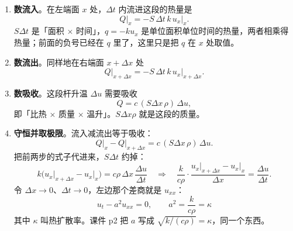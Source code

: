 \begin{enumerate}[label=\textbf{第 \arabic* 步}]
  \item \textbf{数流入}。在左端面 $x$ 处，$\Delta t$ 内流进这段的热量是
  \begin{equation}
    Q\big|_x=-S\,\Delta t\,k\,u_x\big|_x .
  \end{equation}
  $S\Delta t$ 是「面积 $\times$ 时间」，$q=-ku_x$ 是单位面积单位时间的热量，两者相乘得热量；前面的负号已经在 $q$ 里了，这里只是把 $q$ 在 $x$ 处取值。

  \item \textbf{数流出}。同样地在右端面 $x+\Delta x$ 处
  \begin{equation}
    Q\big|_{x+\Delta x}=-S\,\Delta t\,k\,u_x\big|_{x+\Delta x} .
  \end{equation}

  \item \textbf{数吸收}。这段杆升温 $\Delta u$ 需要吸收
  \begin{equation}
    Q=c\,(S\Delta x\,\rho)\,\Delta u ,
  \end{equation}
  即「比热 $\times$ 质量 $\times$ 温升」。$S\Delta x\rho$ 就是这段的质量。

  \item \textbf{守恒并取极限}。流入减流出等于吸收：
  \begin{equation}
    Q\big|_x-Q\big|_{x+\Delta x}=c\,(S\Delta x\,\rho)\,\Delta u .
  \end{equation}
  把前两步的式子代进来，$S\Delta t$ 约掉：
  \begin{equation}
    k\Big(u_x\big|_{x+\Delta x}-u_x\big|_x\Big)=c\rho\,\Delta x\,\frac{\Delta u}{\Delta t}
    \quad\Longrightarrow\quad
    \frac{k}{c\rho}\cdot\frac{u_x\big|_{x+\Delta x}-u_x\big|_x}{\Delta x}=\frac{\Delta u}{\Delta t}.
  \end{equation}
  令 $\Delta x\to0$、$\Delta t\to0$，左边那个差商就是 $u_{xx}$：
  \begin{equation}
    \boxed{\;u_t-a^2u_{xx}=0,\qquad a^2=\frac{k}{c\rho}=\kappa\;}
  \end{equation}
  其中 $\kappa$ 叫热扩散率。课件 p2 把 $a$ 写成 $\sqrt{k/(c\rho)}=\kappa$，同一个东西。
\end{enumerate}

